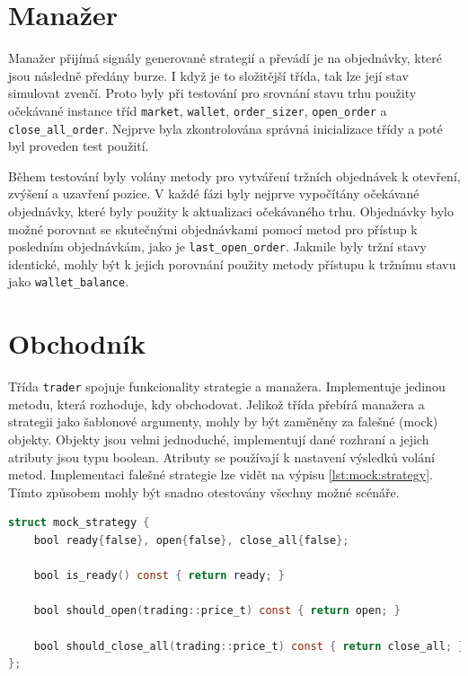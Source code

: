 \section{Manažer}
Manažer přijímá signály generované strategií a převádí je na objednávky, které jsou následně předány burze.
I když je to složitější třída, tak lze její stav simulovat zvenčí.
Proto byly při testování pro srovnání stavu trhu použity očekávané instance tříd \texttt{market}, \texttt{wallet}, \texttt{order\_sizer}, \texttt{open\_order} a \texttt{close\_all\_order}.
Nejprve byla zkontrolována správná inicializace třídy a poté byl proveden test použití.

Během testování byly volány metody pro vytváření tržních objednávek k otevření, zvýšení a uzavření pozice.
V každé fázi byly nejprve vypočítány očekávané objednávky, které byly použity k aktualizaci očekávaného trhu.
Objednávky bylo možné porovnat se skutečnými objednávkami pomocí metod pro přístup k posledním objednávkám, jako je \texttt{last\_open\_order}.
Jakmile byly tržní stavy identické, mohly být k jejich porovnání použity metody přístupu k tržnímu stavu jako \texttt{wallet\_balance}.

\section{Obchodník}
Třída \texttt{trader} spojuje funkcionality strategie a manažera.
Implementuje jedinou metodu, která rozhoduje, kdy obchodovat.
Jelikož třída přebírá manažera a strategii jako šablonové argumenty, mohly by být zaměněny za falešné (mock) objekty.
Objekty jsou velmi jednoduché, implementují dané rozhraní a jejich atributy jsou typu boolean.
Atributy se používají k nastavení výsledků volání metod.
Implementaci falešné strategie lze vidět na výpisu \ref{lst:mock:strategy}.
Tímto způsobem mohly být snadno otestovány všechny možné scénáře.

\begin{lstlisting}[caption={~Implementace falešná strategie},label={lst:mock:strategy},captionpos=t,abovecaptionskip=-\medskipamount,belowcaptionskip=\medskipamount,language=C]
struct mock_strategy {
    bool ready{false}, open{false}, close_all{false};

    bool is_ready() const { return ready; }

    bool should_open(trading::price_t) const { return open; }

    bool should_close_all(trading::price_t) const { return close_all; }
};
\end{lstlisting}

